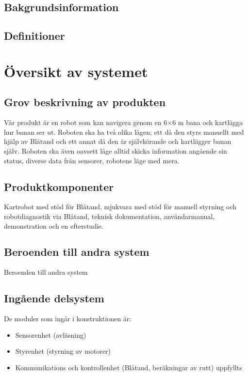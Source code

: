 \documentclass[a4paper,11pt]{article}
\begin{document}
\subsection{Bakgrundsinformation}
\subsection{Definitioner}


\section{Översikt av systemet}

\subsection{Grov beskrivning av produkten}
Vår produkt är en robot som kan navigera genom en 6$ \times $6 m bana och kartlägga hur banan ser ut. Roboten ska ha två olika lägen; ett då den styrs manuellt med hjälp av Blåtand och ett annat då den är självkörande och kartlägger banan själv. Roboten ska även oavsett läge alltid skicka information angående sin status, diverse data från sensorer, robotens läge med mera. 

\subsection{Produktkomponenter}
Kartrobot med stöd för Blåtand, mjukvara med stöd för manuell styrning och robotdiagnostik via Blåtand, teknisk dokumentation, användarmanual, demonstration och en efterstudie. 

\subsection{Beroenden till andra system }
Beroenden till andra system 

\subsection{Ingående delsystem}
De moduler som ingår i konstruktionen är:
\begin{itemize}
    \item Sensorenhet (avläsning) 
    \item Styrenhet (styrning av motorer) 
    \item Kommunikations och kontrollenhet (Blåtand, beräkningar av rutt)  uppfyllts 
\end{itemize}
\end{document}
